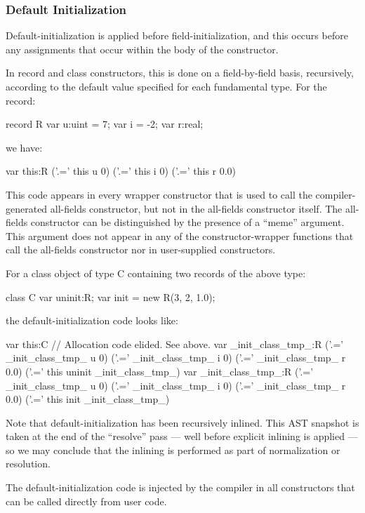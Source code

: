 \subsubsection{Default Initialization}

Default-initialization is applied before field-initialization, and this occurs before any
assignments that occur within the body of the constructor.

In record and class constructors, this is done on a field-by-field basis, recursively,
according to the default value specified for each fundamental type.  For the record:
\begin{chapel}
record R {
  var u:uint = 7;
  var i      = -2;
  var r:real;
}
\end{chapel}
\noindent
we have: 
\begin{chapelcode}
    var this:R
    ('.=' this u 0)
    ('.=' this i 0)
    ('.=' this r 0.0)
\end{chapelcode}
\noindent
This code appears in every wrapper constructor that is used to call the compiler-generated
all-fields constructor, but not in the all-fields constructor itself.  The all-fields
constructor can be distinguished by the presence of a ``meme'' argument.  This argument
does not appear in any of the constructor-wrapper functions that call the all-fields
constructor nor in user-supplied constructors.

For a class object of type C containing two records of the above type:
\begin{chapel}
class C {
  var uninit:R;
  var init = new R(3, 2, 1.0);
}
\end{chapel}
\noindent
the default-initialization code looks like:
\begin{chapelcode}
    var this:C
    // Allocation code elided. See above.
    var _init_class_tmp_:R
    ('.=' _init_class_tmp_ u 0)
    ('.=' _init_class_tmp_ i 0)
    ('.=' _init_class_tmp_ r 0.0)
    ('.=' this uninit _init_class_tmp_)
    var _init_class_tmp_:R
    ('.=' _init_class_tmp_ u 0)
    ('.=' _init_class_tmp_ i 0)
    ('.=' _init_class_tmp_ r 0.0)
    ('.=' this init _init_class_tmp_)
\end{chapelcode}
\noindent
Note that default-initialization has been recursively inlined.  This AST snapshot
is taken at the end of the ``resolve'' pass --- well before explicit inlining is applied
--- so we may conclude that the inlining is performed as part of normalization or resolution.

The default-initialization code is injected by the compiler in all constructors that can be
called directly from user code.

